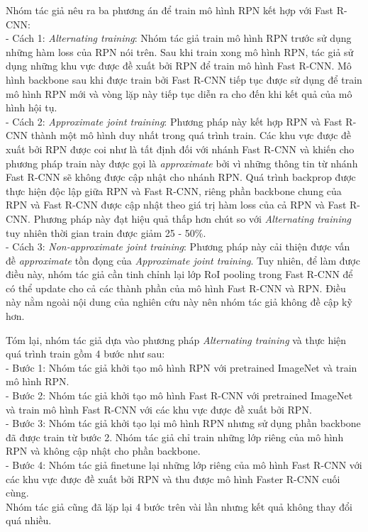 {    \noindent
    Nhóm tác giả nêu ra ba phương án để train mô hình RPN kết hợp với Fast R-CNN: \\
    - Cách 1: \textit{Alternating training}: Nhóm tác giả train mô hình RPN trước sử dụng những hàm loss của RPN nói trên.
    Sau khi train xong mô hình RPN, tác giả sử dụng những khu vực được đề xuất bởi RPN để train mô hình Fast R-CNN.
    Mô hình backbone sau khi được train bởi Fast R-CNN tiếp tục được sử dụng để train mô hình RPN mới và vòng lặp này tiếp tục diễn ra cho đến khi kết quả của mô hình hội tụ. \\
    - Cách 2: \textit{Approximate joint training}: Phương pháp này kết hợp RPN và Fast R-CNN thành một mô hình duy nhất trong quá trình train.
    Các khu vực được đề xuất bởi RPN được coi như là tất định đối với nhánh Fast R-CNN và khiến cho phương pháp train này được gọi là \textit{approximate} bởi vì những thông tin từ nhánh Fast R-CNN sẽ không được cập nhật cho nhánh RPN.
    Quá trình backprop được thực hiện độc lập giữa RPN và Fast R-CNN, riêng phần backbone chung của RPN và Fast R-CNN được cập nhật theo giá trị hàm loss của cả RPN và Fast R-CNN.
    Phương pháp này đạt hiệu quả thấp hơn chút so với \textit{Alternating training} tuy nhiên thời gian train được giảm 25 - 50\%. \\
    - Cách 3: \textit{Non-approximate joint training}: Phương pháp này cải thiện được vấn đề \textit{approximate} tồn đọng của \textit{Approximate joint training}.
    Tuy nhiên, để làm được điều này, nhóm tác giả cần tinh chỉnh lại lớp RoI pooling trong Fast R-CNN để có thể update cho cả các thành phần của mô hình Fast R-CNN và RPN.
    Điều này nằm ngoài nội dung của nghiên cứu này nên nhóm tác giả không đề cập kỹ hơn.

    \noindent
    Tóm lại, nhóm tác giả dựa vào phương pháp \textit{Alternating training} và thực hiện quá trình train gồm 4 bước như sau: \\
    - Bước 1: Nhóm tác giả khởi tạo mô hình RPN với pretrained ImageNet và train mô hình RPN. \\
    - Bước 2: Nhóm tác giả khởi tạo mô hình Fast R-CNN với pretrained ImageNet và train mô hình Fast R-CNN với các khu vực được đề xuất bởi RPN. \\
    - Bước 3: Nhóm tác giả khởi tạo lại mô hình RPN nhưng sử dụng phần backbone đã được train từ bước 2.
    Nhóm tác giả chỉ train những lớp riêng của mô hình RPN và không cập nhật cho phần backbone. \\
    - Bước 4: Nhóm tác giả finetune lại những lớp riêng của mô hình Fast R-CNN với các khu vực được đề xuất bởi RPN và thu được mô hình Faster R-CNN cuối cùng. \\
    Nhóm tác giả cũng đã lặp lại 4 bước trên vài lần nhưng kết quả không thay đổi quá nhiều.

}
